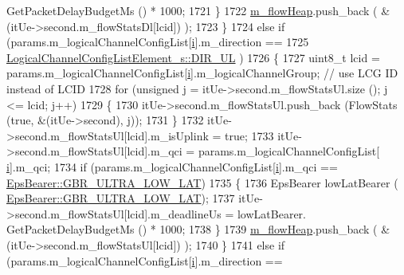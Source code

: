 \begin{DoxyCode}
      GetPacketDelayBudgetMs () * 1000;
1721                         \}
1722                         \hyperlink{classns3_1_1MmWaveFlexTtiPfMacScheduler_a376eaf1c328d3a6b91d0b5c5bae16315}{m\_flowHeap}.push\_back ( &(itUe->second.m\_flowStatsDl[lcid]) );
1723                 \}
1724                 \textcolor{keywordflow}{else} \textcolor{keywordflow}{if} (params.m\_logicalChannelConfigList[\hyperlink{bernuolliDistribution_8m_a6f6ccfcf58b31cb6412107d9d5281426}{i}].m\_direction ==
1725                                 \hyperlink{structns3_1_1LogicalChannelConfigListElement__s_a0ce1e3a6af4d9a3e9fc19361d0af4e00acc9eb2fd165cc693771639203d6212a9}{LogicalChannelConfigListElement\_s::DIR\_UL}
      )
1726                 \{
1727                 uint8\_t lcid = params.m\_logicalChannelConfigList[\hyperlink{bernuolliDistribution_8m_a6f6ccfcf58b31cb6412107d9d5281426}{i}].m\_logicalChannelGroup; \textcolor{comment}{// use LCG ID
       instead of LCID}
1728                 \textcolor{keywordflow}{for} (\textcolor{keywordtype}{unsigned} j = itUe->second.m\_flowStatsUl.size (); j <= lcid; j++)
1729                 \{
1730                         itUe->second.m\_flowStatsUl.push\_back (FlowStats (\textcolor{keyword}{true}, &(itUe->second), j));
1731                 \}
1732                         itUe->second.m\_flowStatsUl[lcid].m\_isUplink = \textcolor{keyword}{true};
1733                         itUe->second.m\_flowStatsUl[lcid].m\_qci = params.m\_logicalChannelConfigList[
      \hyperlink{bernuolliDistribution_8m_a6f6ccfcf58b31cb6412107d9d5281426}{i}].m\_qci;
1734                         \textcolor{keywordflow}{if} (params.m\_logicalChannelConfigList[\hyperlink{bernuolliDistribution_8m_a6f6ccfcf58b31cb6412107d9d5281426}{i}].m\_qci == 
      \hyperlink{structns3_1_1EpsBearer_aecf0c67109c5eb4ec0b07226fff5885ea1b3267491c7ea82ddc90b433c429c7c1}{EpsBearer::GBR\_ULTRA\_LOW\_LAT})
1735                         \{
1736                                 EpsBearer lowLatBearer (
      \hyperlink{structns3_1_1EpsBearer_aecf0c67109c5eb4ec0b07226fff5885ea1b3267491c7ea82ddc90b433c429c7c1}{EpsBearer::GBR\_ULTRA\_LOW\_LAT});
1737                                 itUe->second.m\_flowStatsUl[lcid].m\_deadlineUs = lowLatBearer.
      GetPacketDelayBudgetMs () * 1000;
1738                         \}
1739                         \hyperlink{classns3_1_1MmWaveFlexTtiPfMacScheduler_a376eaf1c328d3a6b91d0b5c5bae16315}{m\_flowHeap}.push\_back ( &(itUe->second.m\_flowStatsUl[lcid]) );
1740                 \}
1741                 \textcolor{keywordflow}{else} \textcolor{keywordflow}{if} (params.m\_logicalChannelConfigList[\hyperlink{bernuolliDistribution_8m_a6f6ccfcf58b31cb6412107d9d5281426}{i}].m\_direction ==

\end{DoxyCode}
